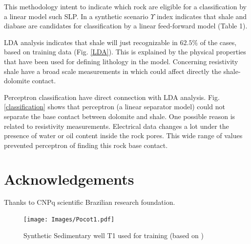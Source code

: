 \documentclass{cilamce19}
\begin{document}
This methodology intent to indicate which rock are eligible for a classification by a linear model such SLP. In a synthetic scenario $\Upsilon$ index indicates that shale and diabase are candidates for classification by a linear feed-forward model (Table 1).

LDA analysis indicates that shale will just recognizable in $62.5\%$ of the cases, based on training data (Fig. \ref{LDA}). This is explained by the physical properties that have been used for defining lithology in the model. Concerning resistivity shale have a broad scale measurements in which could affect directly the shale-dolomite contact.

Perceptron classification have direct connection with LDA analysis. Fig. \ref{classification} shows that perceptron (a linear separator model) could not separate the base contact between dolomite and shale. One possible reason is related to resistivity measurements. Electrical data changes a lot under the presence of water or oil content inside the rock pores. This wide range of values prevented perceptron of finding this rock base contact.


\section*{Acknowledgements}
Thanks to CNPq scientific Brazilian research foundation. 

\begin{figure}[H]
	\centering %
	\texttt{[image: Images/Pocot1.pdf]}
	\caption{Synthetic Sedimentary well T1 used for training (based on \citet{Sal2008}) }
	\label{t1}
\end{figure}

  
  
\end{document}

